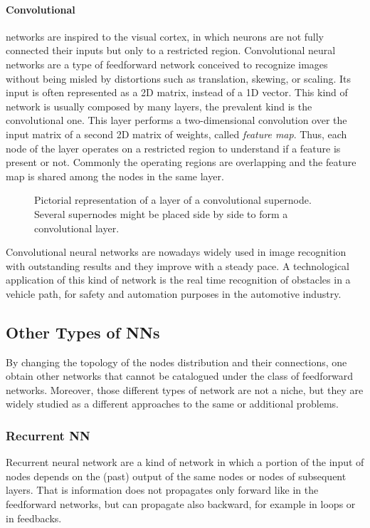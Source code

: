 \paragraph{Convolutional}\label{par:Convolutional} networks are inspired to the visual cortex, in which neurons are not fully connected their inputs but only to a restricted region.
Convolutional neural networks are a type of feedforward network conceived to recognize images without being misled by distortions such as translation, skewing, or scaling.
Its input is often represented as a 2D matrix, instead of a 1D vector.
This kind of network is usually composed by many layers, the prevalent kind is the convolutional one.
This layer performs a two-dimensional convolution over the input matrix of a second 2D matrix of weights, called \textit{feature map}.
Thus, each node of the layer operates on a restricted region to understand if a feature is present or not.
Commonly the operating regions are overlapping and the feature map is shared among the nodes in the same layer.

\begin{figure}[ht]
	\centering
	
	\caption{%
		Pictorial representation of a layer of a convolutional supernode.
		Several supernodes might be placed side by side to form a convolutional layer.
		}
	\label{fig:convolutionalNN}
\end{figure}

Convolutional neural networks are nowadays widely used in image recognition with outstanding results and they improve with a steady pace.
A technological application of this kind of network is the real time recognition of obstacles in a vehicle path, for safety and automation purposes in the automotive industry.

\subsection{Other Types of NNs}
\label{ssec:Other_Types_of_NNs}
By changing the topology of the nodes distribution and their connections, one obtain other networks that cannot be catalogued under the class of feedforward networks.
Moreover, those different types of network are not a niche, but they are widely \cite{??} studied as a different approaches to the same or additional problems.

\subsubsection{Recurrent NN}
\label{sssec:Recurrent_NN}
Recurrent neural network are a kind of network in which a portion of the input of nodes depends on the (past) output of the same nodes or nodes of subsequent layers.
That is information does not propagates only forward like in the feedforward networks, but can propagate also backward, for example in loops or in feedbacks.

